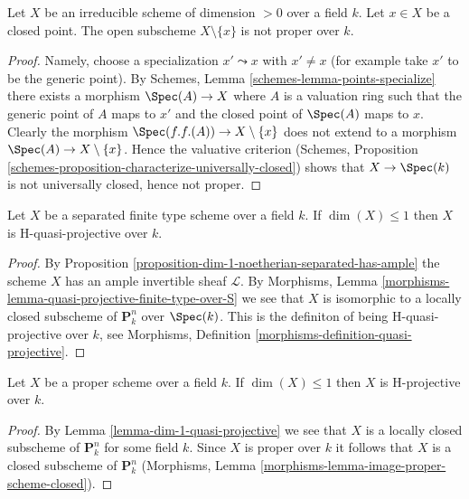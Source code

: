 \begin{lemma}
\label{lemma-proper-minus-point}
Let $X$ be an irreducible scheme of dimension $> 0$ over a field $k$.
Let $x \in X$ be a closed point. The open subscheme $X \setminus \{x\}$
is not proper over $k$.
\end{lemma}

\begin{proof}
Namely, choose a specialization $x' \leadsto x$ with $x' \not = x$
(for example take $x'$ to be the generic point). By
Schemes, Lemma \ref{schemes-lemma-points-specialize}
there exists a morphism $\Spec(A) \to X$
where $A$ is a valuation ring such that the generic point of $A$
maps to $x'$ and the closed point of $\Spec(A)$ maps to $x$.
Clearly the morphism $\Spec(f.f.(A)) \to X \setminus \{x\}$ does
not extend to a morphism $\Spec(A) \to X \setminus \{x\}$. Hence
the valuative criterion
(Schemes, Proposition
\ref{schemes-proposition-characterize-universally-closed})
shows that $X \to \Spec(k)$ is not universally closed, hence not proper.
\end{proof}

\begin{lemma}
\label{lemma-dim-1-quasi-projective}
Let $X$ be a separated finite type scheme over a field $k$.
If $\dim(X) \leq 1$ then $X$ is H-quasi-projective over $k$.
\end{lemma}

\begin{proof}
By Proposition \ref{proposition-dim-1-noetherian-separated-has-ample}
the scheme $X$ has an ample invertible sheaf $\mathcal{L}$.
By Morphisms, Lemma \ref{morphisms-lemma-quasi-projective-finite-type-over-S}
we see that $X$ is isomorphic to a locally
closed subscheme of $\mathbf{P}^n_k$ over $\Spec(k)$. This is
the definiton of being H-quasi-projective over $k$, see
Morphisms, Definition \ref{morphisms-definition-quasi-projective}.
\end{proof}

\begin{lemma}
\label{lemma-dim-1-proper-projective}
Let $X$ be a proper scheme over a field $k$.
If $\dim(X) \leq 1$ then $X$ is H-projective over $k$.
\end{lemma}

\begin{proof}
By Lemma \ref{lemma-dim-1-quasi-projective} we see that $X$ is a
locally closed subscheme of $\mathbf{P}^n_k$ for some field $k$.
Since $X$ is proper over $k$ it follows that $X$ is a closed subscheme
of $\mathbf{P}^n_k$
(Morphisms, Lemma \ref{morphisms-lemma-image-proper-scheme-closed}).
\end{proof}

